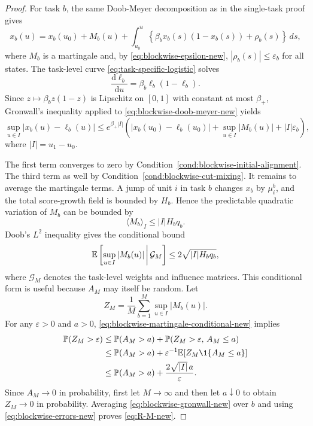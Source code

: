 \begin{proof}
For task $b$, the same Doob-Meyer decomposition as in the single-task proof gives
\begin{equation}
    x_b(u)=x_b(u_0)+M_b(u)+\int_{u_0}^{u}\left\{\beta_b x_b(s)(1-x_b(s))+\rho_b(s)\right\}\,ds,
    \label{eq:blockwise-doob-meyer-new}
\end{equation}
where $M_b$ is a martingale and, by \eqref{eq:blockwise-epsilon-new}, $|\rho_b(s)|\le\varepsilon_b$ for all states. The task-level curve \eqref{eq:task-specific-logistic} solves
\begin{equation*}
    \frac{\mathrm{d}\ell_b}{\mathrm{d}u}=\beta_b\ell_b(1-\ell_b).
\end{equation*}
Since $z\mapsto \beta_b z(1-z)$ is Lipschitz on $[0,1]$ with constant at most $\beta_+$, Gronwall's inequality applied to \eqref{eq:blockwise-doob-meyer-new} yields
\begin{equation}
    \sup_{u\in I}|x_b(u)-\ell_b(u)|
    \le
    e^{\beta_+|I|}
    \left(
      |x_b(u_0)-\ell_b(u_0)|+
      \sup_{u\in I}|M_b(u)|+
      |I|\varepsilon_b
    \right),
    \label{eq:blockwise-gronwall-new}
\end{equation}
where $|I|=u_1-u_0$. 

The first term converges to zero by Condition~\ref{cond:blockwise-initial-alignment}. The third term as well by Condition~\ref{cond:blockwise-cut-mixing}. It remains to average the martingale terms. A jump of unit $i$ in task $b$ changes $x_b$ by $\mu_i^b$, and the total score-growth field is bounded by $H_b$. Hence the predictable quadratic variation of \(M_b\) can be bounded by
\begin{equation*}
    \langle M_b\rangle_{I}\le |I|H_b q_b.
\end{equation*}
Doob's $L^2$ inequality gives the conditional bound
\begin{equation}
    \mathbb{E}\left[\sup_{u\in I}|M_b(u)|\,\middle|\,\mathcal G_M\right]
    \le 2\sqrt{|I|H_b q_b},
    \label{eq:blockwise-martingale-conditional-new}
\end{equation}
where $\mathcal G_M$ denotes the task-level weights and influence matrices. This conditional form is useful because $A_M$ may itself be random. Let
\begin{equation*}
    Z_M=\frac1M\sum_{b=1}^{M}\sup_{u\in I}|M_b(u)|.
\end{equation*}
For any $\varepsilon>0$ and $a>0$, \eqref{eq:blockwise-martingale-conditional-new} implies
\begin{align*}
    \Prob(Z_M>\varepsilon)
    &\le \Prob(A_M>a)+\Prob(Z_M>\varepsilon,\,A_M\le a) \\
    &\le \Prob(A_M>a)+\varepsilon^{-1}\E[Z_M\1\{A_M\le a\}] \\
    &\le \Prob(A_M>a)+\frac{2\sqrt{|I|}\,a}{\varepsilon}.
\end{align*}
Since $A_M\to0$ in probability, first let $M\to\infty$ and then let $a\downarrow0$ to obtain $Z_M\to0$ in probability. Averaging \eqref{eq:blockwise-gronwall-new} over $b$ and using \eqref{eq:blockwise-errors-new} proves \eqref{eq:R-M-new}.
\end{proof}

